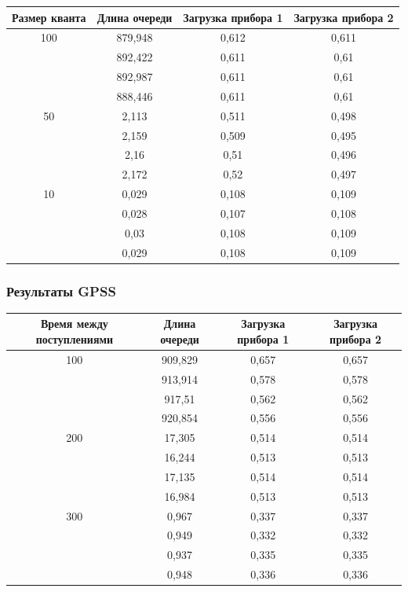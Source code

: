 \begin{tabular}{|c|c|c|c|}
\hline
Размер кванта & Длина очереди & Загрузка прибора 1 & Загрузка прибора 2\\ \hline
100  & 879,948 & 0,612 & 0,611 \\ \hline
 & 892,422 & 0,611 & 0,61 \\ \hline
 & 892,987 & 0,611 & 0,61 \\ \hline
 & 888,446 & 0,611 & 0,61 \\ \hline
50 & 2,113 & 0,511 & 0,498 \\ \hline
 & 2,159 & 0,509 & 0,495 \\ \hline
 & 2,16 & 0,51 & 0,496 \\ \hline
 & 2,172 & 0,52 & 0,497 \\ \hline
10 & 0,029 & 0,108 & 0,109 \\ \hline
 & 0,028 & 0,107 & 0,108 \\ \hline
 & 0,03 & 0,108 & 0,109 \\ \hline
 & 0,029 & 0,108 & 0,109 \\ \hline

\end{tabular}

\subsubsection{Результаты GPSS}

\begin{tabular}{|c|c|c|c|}
\hline
Время между поступлениями & Длина очереди  & Загрузка прибора 1 & Загрузка прибора 2 \\ \hline
100 & 909,829 & 0,657 & 0,657 \\ \hline
 & 913,914 & 0,578 & 0,578 \\ \hline
 & 917,51 & 0,562 & 0,562 \\ \hline
 & 920,854 & 0,556 & 0,556 \\ \hline
200 & 17,305 & 0,514 & 0,514 \\ \hline
 & 16,244 & 0,513 & 0,513 \\ \hline
 & 17,135 & 0,514 & 0,514 \\ \hline
 & 16,984 & 0,513 & 0,513 \\ \hline
300 & 0,967 & 0,337 & 0,337 \\ \hline
 & 0,949 & 0,332 & 0,332 \\ \hline
 & 0,937 & 0,335 & 0,335 \\ \hline
 & 0,948 & 0,336 & 0,336 \\ \hline
\end{tabular}

